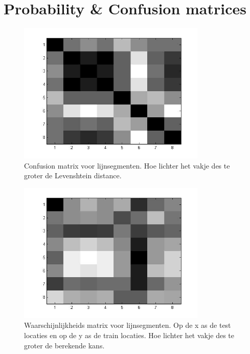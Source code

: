 \documentclass[a4paper]{article}
\begin{document}
\section{Probability \& Confusion matrices}

\begin{figure}[h]
	\centering
	\includegraphics[width=0.8\textwidth]{confusion_line.jpg}
	\caption{Confusion matrix voor lijnsegmenten. Hoe lichter het vakje des te groter de Levenshtein distance.}
	\label{fig:confusion_line}
\end{figure}

\begin{figure}[h]
	\centering
	\includegraphics[width=0.8\textwidth]{line_prob.jpg}
	\caption{Waarschijnlijkheids matrix voor lijnsegmenten. Op de x as de test locaties en op de y as de train locaties. Hoe lichter het vakje des te groter de berekende kans.}
	\label{fig:line_prob}
\end{figure}
\end{document}
